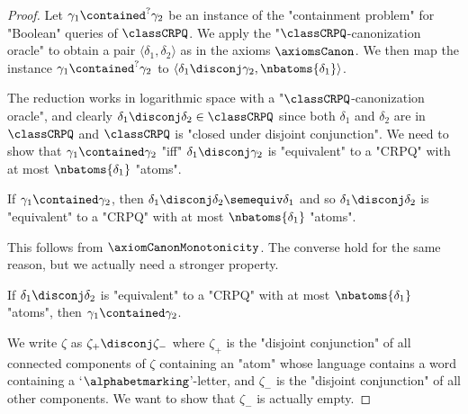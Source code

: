 \begin{proof}
	Let $\gamma_1 \contained^{?} \gamma_2$ be an instance of the "containment problem" for "Boolean" queries of $\classCRPQ$.
	We apply the "$\classCRPQ$-canonization oracle" to obtain 
	a pair $\langle \delta_1, \delta_2 \rangle$ as in the axioms $\axiomsCanon$.
	We then map the instance $\gamma_1 \contained^{?} \gamma_2$ to 
	$\langle \delta_1 \disconj \gamma_2, \nbatoms{\delta_1} \rangle$.

	The reduction works in logarithmic space with a "$\classCRPQ$-canonization oracle",
	and clearly $\delta_1 \disconj \delta_2 \in \classCRPQ$ since
	both $\delta_1$ and $\delta_2$ are in $\classCRPQ$ and $\classCRPQ$ is "closed under disjoint conjunction".
	We need to show that $\gamma_1 \contained \gamma_2$ "iff" $\delta_1 \disconj \gamma_2$
	is "equivalent" to a "CRPQ" with at most $\nbatoms{\delta_1}$ "atoms".

	\begin{claim}
		\AP\label{claim:reduction-containment-to-minimization-1}
		If $\gamma_1 \contained \gamma_2$, then $\delta_1 \disconj \delta_2 \semequiv \delta_1$
		and so $\delta_1 \disconj \delta_2$ is "equivalent" to a "CRPQ" with at most $\nbatoms{\delta_1}$ "atoms".
	\end{claim}

	This follows from $\axiomCanonMonotonicity$.
	The converse hold for the same reason, but we actually need a stronger property.

	\begin{claim}
		\AP\label{claim:reduction-containment-to-minimization-2}
		If $\delta_1 \disconj \delta_2$ is "equivalent" to a "CRPQ"
		with at most $\nbatoms{\delta_1}$ "atoms", then $\gamma_1 \contained \gamma_2$.
	\end{claim}

	We write $\zeta$ as $\zeta_+ \disconj \zeta_-$ where $\zeta_+$ is
	the "disjoint conjunction" of all connected components of $\zeta$ containing
	an "atom" whose language contains a word containing a `$\alphabetmarking$'-letter,
	and $\zeta_-$ is the "disjoint conjunction" of all other
	components. We want to show that $\zeta_-$ is actually empty.


\end{proof}
